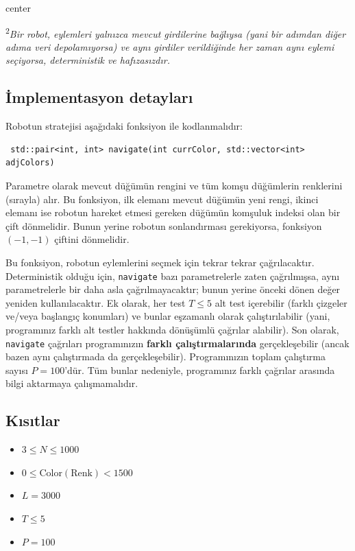 \documentclass[12pt]{article}
\begin{document}
\begin{adjustbox}{center}
	
\end{adjustbox}

\textsuperscript{2}\textit{Bir robot, eylemleri yalnızca mevcut girdilerine bağlıysa (yani bir adımdan diğer adıma veri depolamıyorsa) ve aynı girdiler verildiğinde her zaman aynı eylemi seçiyorsa, deterministik ve hafızasızdır.}

\subsection{İmplementasyon detayları}
Robotun stratejisi aşağıdaki fonksiyon ile kodlanmalıdır:
\begin{lstlisting}
 std::pair<int, int> navigate(int currColor, std::vector<int> adjColors)
\end{lstlisting}

Parametre olarak mevcut düğümün rengini ve tüm komşu düğümlerin renklerini (sırayla) alır. Bu fonksiyon, ilk elemanı mevcut düğümün yeni rengi, ikinci elemanı ise robotun hareket etmesi gereken düğümün komşuluk indeksi olan bir çift dönmelidir. Bunun yerine robotun sonlandırması gerekiyorsa, fonksiyon $(-1, -1)$ çiftini dönmelidir.

Bu fonksiyon, robotun eylemlerini seçmek için tekrar tekrar çağrılacaktır. Deterministik olduğu için, \texttt{navigate} bazı parametrelerle zaten çağrılmışsa, aynı parametrelerle bir daha asla çağrılmayacaktır; bunun yerine önceki dönen değer yeniden kullanılacaktır. Ek olarak, her test $T \leq 5$ alt test içerebilir (farklı çizgeler ve/veya başlangıç konumları) ve bunlar eşzamanlı olarak çalıştırılabilir (yani, programınız farklı alt testler hakkında dönüşümlü çağrılar alabilir). Son olarak, \texttt{navigate} çağrıları programınızın \textbf{farklı çalıştırmalarında} gerçekleşebilir (ancak bazen aynı çalıştırmada da gerçekleşebilir). Programınızın toplam çalıştırma sayısı $P = 100$'dür. Tüm bunlar nedeniyle, programınız farklı çağrılar arasında bilgi aktarmaya çalışmamalıdır.

\subsection{Kısıtlar}

\begin{itemize}
\item $3 \leq N \leq 1000$
\item $0 \leq \mathrm{Color (Renk)} < 1500$
\item $L = 3000$
\item $T \leq 5$
\item $P = 100$
\end{itemize}
\end{document}
